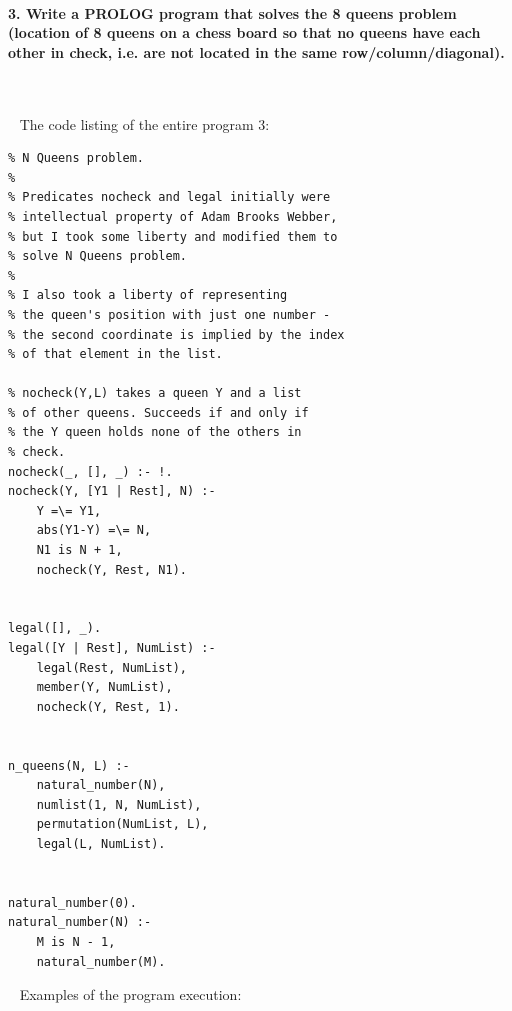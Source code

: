 \documentclass{article}
\begin{document}
	
	\rmfamily
	
	\paragraph{3. Write a PROLOG program that solves the 8 queens problem (location of 8 queens on a chess board so that no queens have each other in check, i.e. are not located in the same row/column/diagonal). }\
	\newline

	
	
	\rmfamily\
	\newline
	\noindent The code listing of the entire program 3:
	
	\begin{verbatim}
% N Queens problem. 
% 
% Predicates nocheck and legal initially were
% intellectual property of Adam Brooks Webber,
% but I took some liberty and modified them to 
% solve N Queens problem. 
%
% I also took a liberty of representing 
% the queen's position with just one number - 
% the second coordinate is implied by the index 
% of that element in the list.

% nocheck(Y,L) takes a queen Y and a list
% of other queens. Succeeds if and only if 
% the Y queen holds none of the others in 
% check.
nocheck(_, [], _) :- !.
nocheck(Y, [Y1 | Rest], N) :-
    Y =\= Y1,
    abs(Y1-Y) =\= N,
    N1 is N + 1,
    nocheck(Y, Rest, N1).


legal([], _).
legal([Y | Rest], NumList) :-
    legal(Rest, NumList),
    member(Y, NumList),
    nocheck(Y, Rest, 1).


n_queens(N, L) :-
    natural_number(N),
    numlist(1, N, NumList),
    permutation(NumList, L),
    legal(L, NumList).


natural_number(0).
natural_number(N) :- 
    M is N - 1, 
    natural_number(M).
	\end{verbatim}
		
	\rmfamily\
	\newline
	\noindent Examples of the program execution:
	
\end{document}

